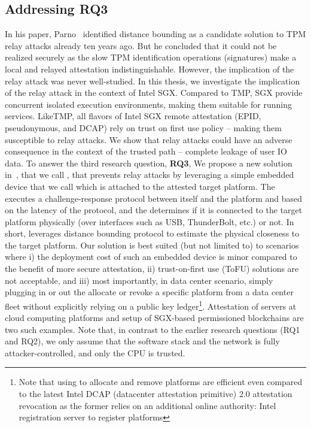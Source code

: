     \subsection{Addressing RQ3}

In his paper, Parno~\cite{parno2008bootstrapping} identified distance bounding as a candidate solution to TPM relay attacks already ten years ago. But he concluded that it could not be realized securely as the slow TPM identification operations (signatures) make a local and relayed attestation indistinguishable. However, the implication of the relay attack was never well-studied. In this thesis, we investigate the implication of the relay attack in the context of Intel SGX. Compared to TMP, SGX provide concurrent isolated execution environments, making them suitable for running services. LikeTMP, all flavors of Intel SGX remote attestation (EPID, pseudonymous, and DCAP) rely on trust on first use policy -- making them susceptible to relay attacks. We show that relay attacks could have an adverse consequence in the context of the trusted path -- complete leakage of user IO data. To answer the third research question, \textbf{RQ3},  We propose a new solution in~, that we call \proximitee, that prevents relay attacks by leveraging a simple embedded device that we call \deviceproximitee which is attached to the attested target platform. The \deviceproximitee executes a challenge-response protocol between itself and the platform and based on the latency of the protocol, and the \deviceproximitee determines if it is connected to the target platform physically (over interfaces such as USB, ThunderBolt, etc.) or not. In short, \deviceproximitee leverages distance bounding protocol to estimate the physical closeness to the target platform. Our solution is best suited (but not limited to) to scenarios where i) the deployment cost of such an embedded device is minor compared to the benefit of more secure attestation, ii) trust-on-first use (ToFU) solutions are not acceptable, and iii) most importantly, in data center scenario, simply plugging in or out the \deviceproximitee allocate or revoke a specific platform from a data center fleet without explicitly relying on a public key ledger\footnote{Note that using \proximitee to allocate and remove platforms are efficient even compared to the latest Intel DCAP (datacenter attestation primitive) 2.0 attestation revocation as the former relies on an additional online authority: Intel registration server to register platforms}. Attestation of servers at cloud computing platforms and setup of SGX-based permissioned blockchains are two such examples. Note that, in contrast to the earlier research questions (RQ1 and RQ2), we only assume that the software stack and the network is fully attacker-controlled, and only the CPU is trusted.



